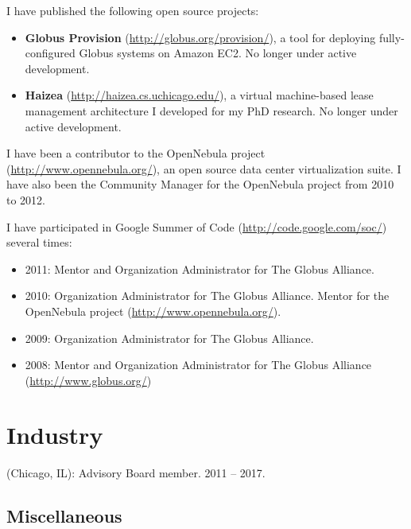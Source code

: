 \documentclass{resume}
\begin{document}
\begin{category}{}
\citembullet I have published the following open source projects:

\begin{itemize}
 \item \textbf{Globus Provision} (\url{http://globus.org/provision/}), a tool for deploying fully-configured Globus systems on Amazon EC2. No longer under active development.
 \item \textbf{Haizea} (\url{http://haizea.cs.uchicago.edu/}), a virtual machine-based lease management architecture I developed for my PhD research. No longer under active development.
\end{itemize}

\citembullet I have been a contributor to the OpenNebula project (\url{http://www.opennebula.org/}), an open source data center virtualization suite. I have also been the Community Manager for the OpenNebula project from 2010 to 2012.

\citembullet I have participated in Google Summer of Code (\url{http://code.google.com/soc/}) several times:

\begin{itemize}
 \item 2011: Mentor and Organization Administrator for The Globus Alliance.
 \item 2010: Organization Administrator for The Globus Alliance. Mentor for the OpenNebula project (\url{http://www.opennebula.org/}).
 \item 2009: Organization Administrator for The Globus Alliance.
 \item 2008: Mentor and Organization Administrator for The Globus Alliance (\url{http://www.globus.org/})
\end{itemize}
\end{category}


\section*{\hspace{-1cm}Industry}

\begin{category}{}
 (Chicago, IL): Advisory Board member. 2011 -- 2017.
\end{category}

\pagebreak

\begin{center}
\section*{\huge Miscellaneous}
\vspace{2ex}
\end{center}
\end{document}
